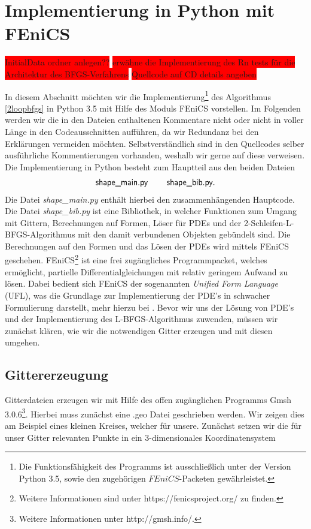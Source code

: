 
\section{Implementierung in Python mit FEniCS}\label{Chapter_implementation}
\colorbox{red}{InitialData ordner anlegen??} \newline
\colorbox{red}{erwähne die Implementierung des Rn tests für die Architektur des BFGS-Verfahrens}\newline
\colorbox{red}{Quellcode auf CD details angeben}


In diesem Abschnitt möchten wir die Implementierung\footnote{Die Funktionsfähigkeit des Programms ist ausschließlich unter der Version Python 3.5, sowie den zugehörigen $FEniCS$-Packeten gewährleistet.} des Algorithmus \ref{2loopbfgs} in Python 3.5 mit Hilfe des Moduls FEniCS vorstellen. Im Folgenden werden wir die in den Dateien enthaltenen Kommentare nicht oder nicht in voller Länge in den Codeausschnitten aufführen, da wir Redundanz bei den Erklärungen vermeiden möchten. Selbstverständlich sind in den Quellcodes selber ausführliche Kommentierungen vorhanden, weshalb wir gerne auf diese verweisen. Die Implementierung in Python besteht zum Hauptteil aus den beiden Dateien
\begin{align*}
\textsf{shape\_main.py} \hspace{0.8cm} \textsf{shape\_bib.py}.
\end{align*}
Die Datei \textit{shape\_main.py} enthält hierbei den zusammenhängenden Hauptcode. Die Datei \textit{shape\_bib.py} ist eine Bibliothek, in welcher Funktionen zum Umgang mit Gittern, Berechnungen auf Formen, Löser für PDEs und der 2-Schleifen-L-BFGS-Algorithmus mit den damit verbundenen Objekten gebündelt sind. Die Berechnungen auf den Formen und das Lösen der PDEs wird mittels FEniCS geschehen.
FEniCS\footnote{Weitere Informationen sind unter https://fenicsproject.org/ zu finden.} ist eine frei zugängliches Programmpacket, welches ermöglicht, partielle Differentialgleichungen mit relativ geringem Aufwand zu lösen. Dabei bedient sich FEniCS der sogenannten \textit{Unified Form Language} (UFL), was die Grundlage zur Implementierung der PDE's in schwacher Formulierung darstellt, mehr hierzu bei \cite{Unifiedformlanguage}. 
Bevor wir uns der Lösung von PDE's und der Implementierung des L-BFGS-Algorithmus zuwenden, müssen wir zunächst klären, wie wir die notwendigen Gitter erzeugen und mit diesen umgehen.

\subsection{Gittererzeugung}
\label{meshgeneration}
Gitterdateien erzeugen wir mit Hilfe des offen zugänglichen Programms \textsf{Gmsh 3.0.6}\footnote{Weitere Informationen unter http://gmsh.info/.}. Hierbei muss  zunächst eine \textsf{.geo} Datei geschrieben werden. Wir zeigen dies am Beispiel eines kleinen Kreises, welcher für unsere.
Zunächst setzen wir die für unser Gitter relevanten Punkte in ein 3-dimensionales Koordinatensystem

